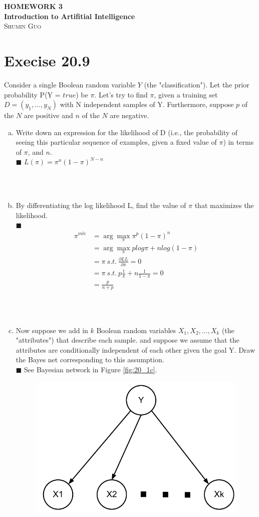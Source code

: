 \documentclass{article}
\newcommand{\solution}[1]{~\\ $\blacksquare$ \sffamily\upshape\selectfont #1
\normalfont ~\\~ }
\begin{document}
\begin{center}
\textbf{\large{
HOMEWORK 3 \\
Introduction to Artifitial Intelligence \\}}
\textsc{\Large{Shumin Guo}}
\end{center}

\section{Execise 20.9}
Consider a single Boolean random variable $Y$ (the
"classification"). Let the prior probability P(Y = $true$) be $\pi$. Let's 
try to find $\pi$, given a training set $D=(y_1,\ldots,y_N)$ with N
independent samples of Y. Furthermore, suppose $p$ of the $N$ are positive
and $n$ of the $N$ are negative.
\begin{enumerate}[a.]
\item Write down an expression for the likelihood of D (i.e., the
probability of seeing this particular sequence of examples, given a
fixed value of $\pi$) in terms of $\pi$, and $n$.
\solution{
  $L(\pi) = \pi^n(1-\pi)^{N-n}$
}
\item By differentiating the log likelihood L, find the value of $\pi$
that maximizes the likelihood.
\solution{
  \begin{align*}
    \pi^{mle}&=\arg\max_{\pi}\pi^p(1-\pi)^n \\
    &= \arg\max_{\pi}plog\pi+nlog(1-\pi) \\
    &= \pi ~s.t.~ \frac{\partial LL}{\partial \pi} = 0 \\ 
    &= \pi ~s.t.~ p\frac{1}{\pi}+n\frac{1}{1-\pi} = 0 \\
    &= \frac{p}{n+p}
  \end{align*}
}
\item Now suppose we add in $k$ Boolean random variables $X_1, X_2,\ldots,X_k
$ (the "attributes") that describe each sample. and suppose we assume
that the attributes are conditionally independent of each other given
the goal Y. Draw the Bayes net corresponding to this assumption.
\solution{
See Bayesian network in Figure \ref{fig:20_1c}.
  \begin{figure}[ht]
    \centering
    \includegraphics[width=.5\textwidth]{AI-HWK3_1c.pdf}

\end{figure}}
\end{enumerate}
\end{document}
